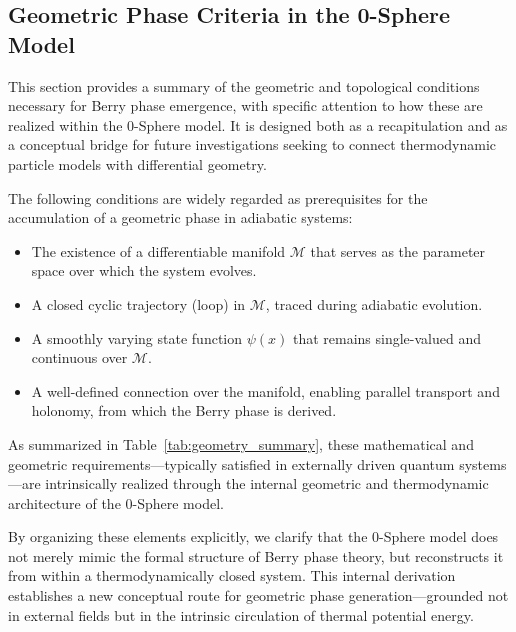 \documentclass[%
 reprint,
 amsmath,amssymb,
 aps,
]{revtex4-1}
\numberwithin{equation}{section}%
\begin{document}
\newpage

\subsection{Geometric Phase Criteria in the 0-Sphere Model} \label{subsec:geometric_criteria}

This section provides a summary of the geometric and topological conditions necessary for Berry phase emergence, with specific attention to how these are realized within the 0-Sphere model. It is designed both as a recapitulation and as a conceptual bridge for future investigations seeking to connect thermodynamic particle models with differential geometry.

The following conditions are widely regarded as prerequisites for the accumulation of a geometric phase in adiabatic systems:

\begin{itemize}
  \item The existence of a differentiable manifold \( \mathcal{M} \) that serves as the parameter space over which the system evolves.
  \item A closed cyclic trajectory (loop) in \( \mathcal{M} \), traced during adiabatic evolution.
  \item A smoothly varying state function \( \psi(x) \) that remains single-valued and continuous over \( \mathcal{M} \).
  \item A well-defined connection over the manifold, enabling parallel transport and holonomy, from which the Berry phase is derived.
\end{itemize}

As summarized in Table~\ref{tab:geometry_summary}, these mathematical and geometric requirements—typically satisfied in externally driven quantum systems—are intrinsically realized through the internal geometric and thermodynamic architecture of the 0-Sphere model.

By organizing these elements explicitly, we clarify that the 0-Sphere model does not merely mimic the formal structure of Berry phase theory, but reconstructs it from within a thermodynamically closed system. This internal derivation establishes a new conceptual route for geometric phase generation—grounded not in external fields but in the intrinsic circulation of thermal potential energy. 
\end{document}
